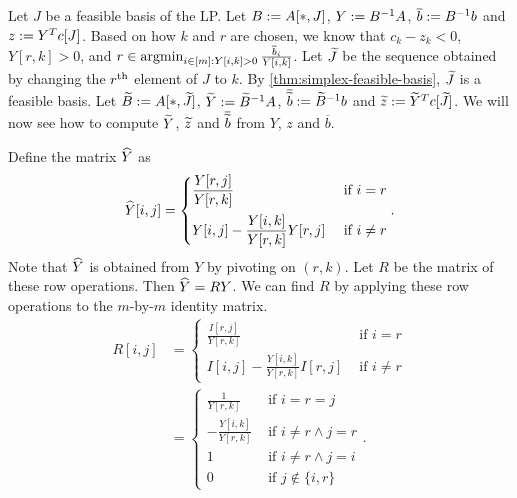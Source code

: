 \documentclass[a4paper, 12pt, fleqn]{article}
\newcommand*{\bline}{\overline{b}}
\newcommand*{\btildline}{\overline{\btild}}
\begin{document}
Let $J$ be a feasible basis of the LP.
Let $B := A[*,J]$, $Y := B^{-1}A$, $\bline \defeq B^{-1}b$ and $z := Y^Tc[J]$.
Based on how $k$ and $r$ are chosen, we know that $c_k - z_k < 0$,
$Y[r,k] > 0$, and $r \in \argmin_{i \in [m]: Y[i,k] > 0} \frac{\bline_i}{Y[i,k]}$.
Let $\widetilde{J}$ be the sequence obtained by changing the $r^{\textrm{th}}$ element of $J$ to $k$.
By \cref{thm:simplex-feasible-basis}, $\widetilde{J}$ is a feasible basis.
Let $\widetilde{B} := A[*,\widetilde{J}]$, $\widetilde{Y} := \widetilde{B}^{-1}A$, $\btildline \defeq \Btild^{-1}b$
and $\widetilde{z} := \widetilde{Y}^Tc[\widetilde{J}]$.
We will now see how to compute $\widetilde{Y}$, $\widetilde{z}$ and $\btildline$
from $Y$, $z$ and $\bline$.

Define the matrix $\widehat{Y}$ as
\[ \widehat{Y}[i,j] = \begin{cases}
\displaystyle \frac{Y[r,j]}{Y[r,k]} & \textrm{ if } i = r
\\[1em] \displaystyle Y[i,j] - \frac{Y[i,k]}{Y[r,k]}Y[r,j] & \textrm{ if } i \neq r
\end{cases}. \]
Note that $\widehat{Y}$ is obtained from $Y$ by pivoting on $(r, k)$.
Let $R$ be the matrix of these row operations. Then $\widehat{Y} = RY$.
We can find $R$ by applying these row operations to the $m$-by-$m$ identity matrix.
\begin{align*}
R[i,j] &= \begin{cases}
\displaystyle \frac{I[r,j]}{Y[r,k]} & \textrm{ if } i = r
\\[1em] \displaystyle I[i,j] - \frac{Y[i,k]}{Y[r,k]}I[r,j] & \textrm{ if } i \neq r
\end{cases}
\\ &= \begin{cases}
\displaystyle \frac{1}{Y[r,k]} & \textrm{ if } i = r = j
\\[1em] \displaystyle -\frac{Y[i,k]}{Y[r,k]} & \textrm{ if } i \neq r \land j = r
\\ \displaystyle 1 & \textrm{ if } i \neq r \land j = i
\\ \displaystyle 0 & \textrm{ if } j \not\in \{i, r\}
\end{cases}.
\end{align*}
\end{document}
